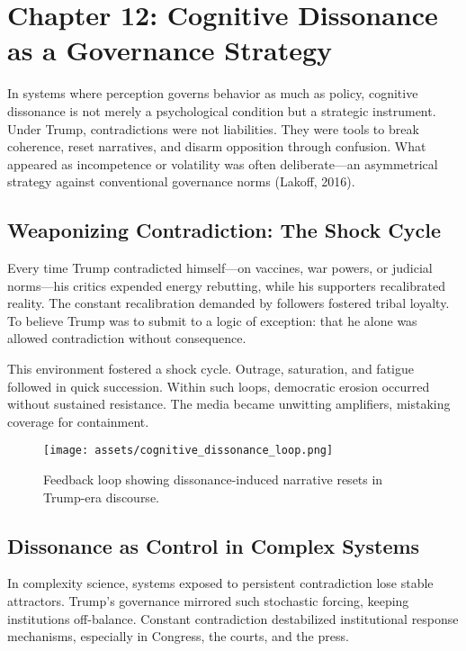 \chapter{Chapter 12: Cognitive Dissonance as a Governance Strategy}

In systems where perception governs behavior as much as policy,
cognitive dissonance is not merely a psychological condition but a
strategic instrument. Under Trump, contradictions were not liabilities.
They were tools to break coherence, reset narratives, and disarm
opposition through confusion. What appeared as incompetence or
volatility was often deliberate---an asymmetrical strategy against
conventional governance norms (Lakoff, 2016).

\section*{Weaponizing Contradiction: The Shock Cycle}

Every time Trump contradicted himself---on vaccines, war powers, or
judicial norms---his critics expended energy rebutting, while his
supporters recalibrated reality. The constant recalibration demanded by
followers fostered tribal loyalty. To believe Trump was to submit to a
logic of exception: that he alone was allowed contradiction without
consequence.

This environment fostered a shock cycle. Outrage, saturation, and
fatigue followed in quick succession. Within such loops, democratic
erosion occurred without sustained resistance. The media became
unwitting amplifiers, mistaking coverage for containment.

\begin{figure}[H]
\centering
\texttt{[image: assets/cognitive\_dissonance\_loop.png]}
\caption{Feedback loop showing dissonance-induced narrative resets in Trump-era discourse.}
\label{fig:cognitive_dissonance_loop}
\end{figure}

\section*{Dissonance as Control in Complex Systems}

In complexity science, systems exposed to persistent contradiction lose
stable attractors. Trump's governance mirrored such stochastic forcing,
keeping institutions off-balance. Constant contradiction destabilized
institutional response mechanisms, especially in Congress, the courts,
and the press.

